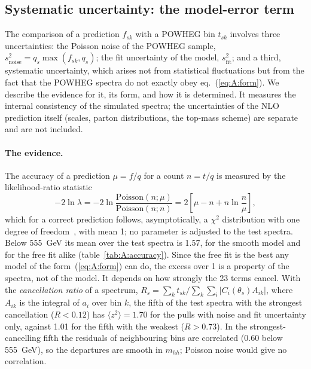 \subsection{Systematic uncertainty: the model-error term}
\label{app:A:syst}

The comparison of a prediction $f_{sk}$ with a POWHEG bin $t_{sk}$ involves three uncertainties: the
Poisson noise of the POWHEG sample, $s^2_\text{noise} = q_s\max(f_{sk},q_s)$; the fit uncertainty of the
model, $s^2_\text{fit}$; and a third, systematic uncertainty, which arises not from statistical
fluctuations but from the fact that the POWHEG spectra do not exactly obey eq.~(\ref{eq:A:form}). We
describe the evidence for it, its form, and how it is determined. It measures the internal consistency of
the simulated spectra; the uncertainties of the NLO prediction itself (scales, parton distributions, the
top-mass scheme) are separate and are not included. %

\paragraph{The evidence.} The accuracy of a prediction $\mu = f/q$ for a count $n = t/q$ is measured by the
likelihood-ratio statistic
\begin{equation}
  -2\ln\lambda = -2\ln\frac{\mathrm{Poisson}(n;\mu)}{\mathrm{Poisson}(n;n)} = 2\left[\mu - n + n\ln\frac{n}{\mu}\right],
  \label{eq:A:lr}
\end{equation}
which for a correct prediction follows, asymptotically, a $\chi^2$ distribution with one degree of
freedom~\cite{Wilks:1938}, with mean 1; no parameter is adjusted to the test spectra. Below 555~GeV its mean
over the test spectra is 1.57, for the smooth model and for the free fit alike (table~\ref{tab:A:accuracy}).
Since the free fit is the best any model of the form~(\ref{eq:A:form}) can do, the excess over 1 is a property
of the spectra, not of the model. It depends on how strongly the 23 terms cancel. With the
\emph{cancellation ratio} of a spectrum, $R_s = \sum_k t_{sk}/\sum_k\sum_i|C_i(\theta_s)A_{ik}|$, where $A_{ik}$ is
the integral of $a_i$ over bin $k$, the fifth of the test spectra with the strongest cancellation
($R < 0.12$) has $\langle z^2\rangle = 1.70$ for the pulls with noise and fit uncertainty only, against 1.01 for
the fifth with the weakest ($R > 0.73$). In the strongest-cancelling fifth the residuals of neighbouring bins
are correlated (0.60 below 555~GeV), so the departures are smooth in $m_{hh}$; Poisson noise would give no
correlation.

